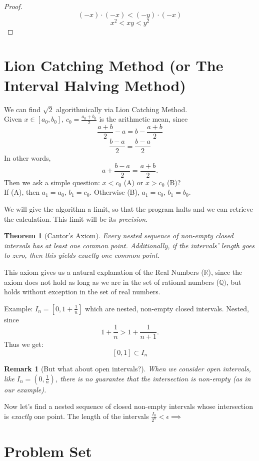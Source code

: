 \documentclass{article}
\newtheorem{theorem}{Theorem}
\newtheorem*{remark}{Remark}
\begin{document}
\begin{proof}
    \[
    (-x) \cdot (-x) < (-y) \cdot (-x)
    \]
    \[
    x^2 < xy < y^2
    \]
\end{proof}

\section{Lion Catching Method (or The Interval Halving Method)}
We can find $\sqrt{2}$ algorithmically via Lion Catching Method.\\
Given $x \in [a_0, b_0]$, $c_0 = \frac{a_0 + b_0}{2}$ is the arithmetic mean, since
\[
    \frac{a + b}{2} - a = b - \frac{a+b}{2}
\]
\[
    \frac{b-a}{2} = \frac{b-a}{2}
\]
In other words,
\[
    a + \frac{b-a}{2} = \frac{a+b}{2}.
\]
Then we ask a simple question: $x < c_0$ (A) or $x > c_0$ (B)?\\
If (A), then $a_1 = a_0$, $b_1 = c_0$. Otherwise (B), $a_1 = c_0$, $b_1 = b_0$.

We will give the algorithm a limit, so that the program halts and we can retrieve the calculation. This limit will be its \emph{precision}.

\begin{theorem}[Cantor's Axiom]
    Every nested sequence of non-empty closed intervals has at least one common point. Additionally, if the intervals' length goes to zero, then this yields \emph{exactly} one common point.
\end{theorem}
This axiom gives us a natural explanation of the Real Numbers ($\mathbb{R}$), since the axiom does not hold as long as we are in the set of rational numbers ($\mathbb{Q})$, but holds without exception in the set of real numbers.

Example: $I_n = [0, 1 + \frac{1}{n}]$ which are nested, non-empty closed intervals. Nested, since
\[
    1 + \frac{1}{n} > 1 + \frac{1}{n+1}.
\]
Thus we get:
\[
    [0, 1] \subset I_n
\]

\begin{remark}[But what about open intervals?]
When we consider open intervals, like $I_n = (0, \frac{1}{n})$, there is no guarantee that the intersection is non-empty (as in our example).
\end{remark}

Now let's find a nested sequence of closed non-empty intervals whose intersection is \emph{exactly} one point.
The length of the intervals $\frac{I_0}{2^n} < \epsilon \implies $ 

\section{Problem Set}
\end{document}
